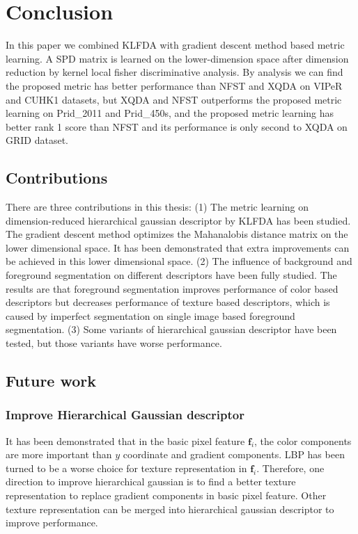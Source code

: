 
\chapter{Conclusion} %

In this paper we combined KLFDA with gradient descent method based metric learning. A SPD matrix is learned on the lower-dimension space after dimension reduction by kernel local fisher discriminative analysis. By analysis we can find the proposed metric has better performance than NFST and XQDA on VIPeR and CUHK1 datasets, but XQDA and NFST outperforms the proposed metric learning on Prid\_2011 and Prid\_450s, and the proposed metric learning has better rank 1 score than NFST and its performance is only second to XQDA on GRID dataset. 
\section{Contributions}
There are three contributions in this thesis: (1) The metric learning on dimension-reduced hierarchical gaussian descriptor by KLFDA has been studied. The gradient descent method optimizes the Mahanalobis distance matrix on the lower dimensional space. It has been demonstrated that extra improvements can be achieved in this lower dimensional space. (2) The influence of background and foreground segmentation on different descriptors have been fully studied. The results are that foreground segmentation improves performance of color based descriptors but decreases performance of texture based descriptors, which is caused by imperfect segmentation on single image based foreground segmentation. (3) Some variants of hierarchical gaussian descriptor have been tested, but those variants have worse performance.
\section{Future work}
\subsection{Improve Hierarchical Gaussian descriptor}
It has been demonstrated that in the basic pixel feature $\bm{f}_i$, the color components are more important than $y$ coordinate and gradient components. LBP has been turned to be a worse choice for texture representation in $\bm{f}_i$. Therefore, one direction to improve hierarchical gaussian is to find a better texture representation to replace gradient components in basic pixel feature. Other texture representation can be merged into hierarchical gaussian descriptor to improve performance.
